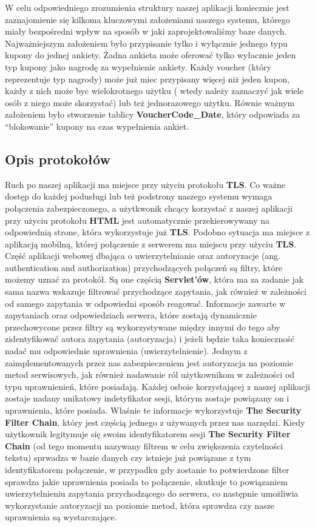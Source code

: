 \documentclass[a4paper]{article}
\begin{document}
W celu odpowiedniego zrozumienia struktury naszej aplikacji koniecznie jest zaznajomienie się kilkoma kluczowymi założeniami naszego systemu, którego miały bezpośredni wpływ na sposób w jaki zaprojektowaliśmy baze danych. Najważniejszym założeniem było przypisanie tylko i wyłącznie jednego typu kupony do jednej ankiety. Żadna ankieta może oferować tylko wyłacznie jeden typ kupony jako nagrodę za wypełnienie ankiety. Każdy voucher (który reprezentuje typ nagrody) może już miec przypisany więcej niż jeden kupon, każdy z nich może byc wielokrotnego użytku ( wtedy należy zaznaczyć jak wiele osób z niego może skorzystać) lub też jednorazowego użytku.
\linebreak
Równie ważnym założeniem było stworzenie tablicy \textbf{VoucherCode\_Date}, który odpowiada za ``blokowanie'' kupony na czas wypełnienia ankiet.
\subsection{Opis protokołów}
Ruch po naszej aplikacji ma miejsce przy użyciu protokołu \textbf{TLS}. Co ważne dostęp do każdej podusługi lub też podstrony naszego systemu wymaga połączenia zabezpieczonego, a użytkwonik chcący korzystać z naszej aplikacji przy użyciu protokołu \textbf{HTML} jest automatycznie przekierowywany na odpowiednią strone, która wykorzystuje już \textbf{TLS}. Podobno sytuacja ma miejsce z aplikacją mobilną, której połączenie z serwerem ma miejscu przy użyciu \textbf{TLS}.
\linebreak
Część aplikacji webowej dbająca o uwierzytelnianie	oraz autoryzacje (ang. authentication and authorization) przychodzących połączeń są filtry, które możemy uznać za protokół. Są one częścią \textbf{Servlet'ów}, która ma za zadanie jak sama nazwa wskazuje filtrować przychodzące zapytania, jak również w zależności od samego zapytania w odpowiedni sposób reagować. Informacje zawarte w zapytaniach oraz odpowiedziach serwera, które zostają dynamicznie przechowycone przez filtry są wykorzystywane między innymi do tego aby zidentyfikować autora zapytania (autoryzacja) i jeżeli będzie taka konieczność nadać mu odpowiednie uprawnienia (uwierzytelnienie). Jednym z zaimplementowanych przez nas zabezpieczeniem jest autoryzacja na poziomie metod serwisowych, jak również nadawanie ról użytkownikom w zależności od typu uprawnienień, które posiadają. Każdej osboie korzystającej z naszej aplikacji zostaje nadany unikatowy indetyfikator sesji, którym zostaje powiązany on i uprawnienia, które posiada. Właśnie te informacje wykorzystuje \textbf{The Security Filter Chain}, który jest częścią jednego z używanych przez nas narzędzi. Kiedy użytkownik legitymuje się swoim identyfikatorem sesji \textbf{The Security Filter Chain} (od tego momentu nazywany filtrem w celu zwiększenia czytelności tekstu) sprwadza w bazie danych czy istnieje już powiązane z tym identyfikatorem połączenie, w przypadku gdy zostanie to potwierdzone filter sprawdza jakie uprawnienia posiada to połączenie, skutkuje to powiązaniem uwierzytelnieniu zapytania przychodzącego do serwera, co następnie umożliwia wykorzystanie autoryzacji na poziomie metod, która sprawdza czy nasze uprawnienia są wystarczające.
\end{document}
